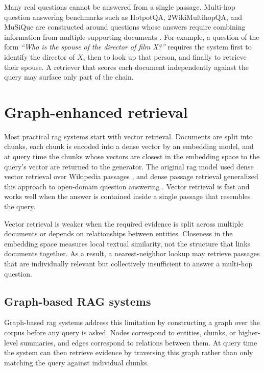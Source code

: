 \documentclass[english, bibtex]{kththesis}               %
\numberwithin{listing}{chapter}
\begin{document}
Many real questions cannot be answered from a single passage. Multi-hop question answering benchmarks such as HotpotQA, 2WikiMultihopQA, and MuSiQue are constructed around questions whose answers require combining information from multiple supporting documents \cite{yang2018hotpotqa,ho2020twowiki,trivedi2022musique}. For example, a question of the form \emph{``Who is the spouse of the director of film X?''} requires the system first to identify the director of \(X\), then to look up that person, and finally to retrieve their spouse. A retriever that scores each document independently against the query may surface only part of the chain.

\section{Graph-enhanced retrieval}
\label{sec:backgroundHybridGraph}

Most practical \gls{rag} systems start with vector retrieval. Documents are split into chunks, each chunk is encoded into a dense vector by an embedding model, and at query time the chunks whose vectors are closest in the embedding space to the query's vector are returned to the generator. The original \gls{rag} model used dense vector retrieval over Wikipedia passages \cite{lewis2020rag}, and dense passage retrieval generalized this approach to open-domain question answering \cite{karpukhin2020dpr}. Vector retrieval is fast and works well when the answer is contained inside a single passage that resembles the query.

Vector retrieval is weaker when the required evidence is split across multiple documents or depends on relationships between entities. Closeness in the embedding space measures local textual similarity, not the structure that links documents together. As a result, a nearest-neighbor lookup may retrieve passages that are individually relevant but collectively insufficient to answer a multi-hop question.

\subsection{Graph-based RAG systems}
\label{sec:backgroundGraphSystems}

Graph-based \gls{rag} systems address this limitation by constructing a graph over the corpus before any query is asked. Nodes correspond to entities, chunks, or higher-level summaries, and edges correspond to relations between them. At query time the system can then retrieve evidence by traversing this graph rather than only matching the query against individual chunks.
\end{document}

